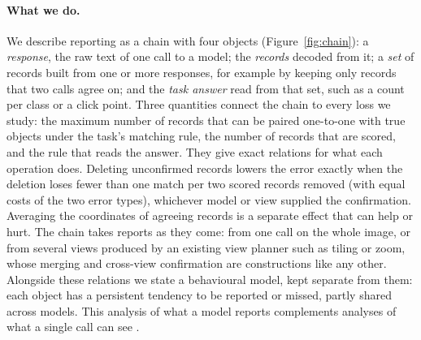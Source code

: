 \paragraph{What we do.} We describe reporting as a chain with four objects (Figure~\ref{fig:chain}): a \emph{response}, the raw text of one call to a model; the \emph{records} decoded from it; a \emph{set} of records built from one or more responses, for example by keeping only records that two calls agree on; and the \emph{task answer} read from that set, such as a count per class or a click point. Three quantities connect the chain to every loss we study: the maximum number of records that can be paired one-to-one with true objects under the task's matching rule, the number of records that are scored, and the rule that reads the answer. They give exact relations for what each operation does. Deleting unconfirmed records lowers the error exactly when the deletion loses fewer than one match per two scored records removed (with equal costs of the two error types), whichever model or view supplied the confirmation. Averaging the coordinates of agreeing records is a separate effect that can help or hurt. The chain takes reports as they come: from one call on the whole image, or from several views produced by an existing view planner such as tiling or zoom, whose merging and cross-view confirmation are constructions like any other. Alongside these relations we state a behavioural model, kept separate from them: each object has a persistent tendency to be reported or missed, partly shared across models. This analysis of what a model reports complements analyses of what a single call can see \citep{shi2026zoomin}.

